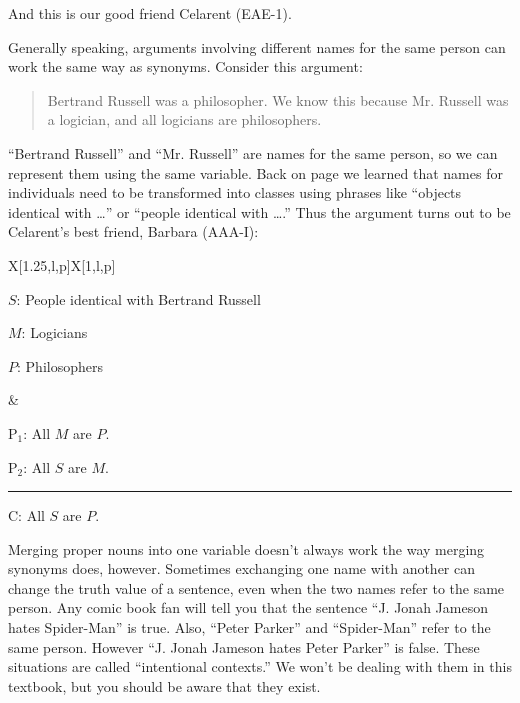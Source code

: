 And this is our good friend Celarent (EAE-1). 

Generally speaking, arguments involving different names for the same person can work the same way as synonyms. Consider this argument:

\begin{quotation}
\noindent Bertrand Russell was a philosopher. We know this because Mr. Russell was a logician, and all logicians are philosophers. 
\end{quotation}

``Bertrand Russell'' and ``Mr. Russell'' are names for the same person, so we can represent them using the same variable. Back on page \pageref{subsec:singular_propositions} we learned that names for individuals need to be transformed into classes using phrases like ``objects identical with \ldots'' or ``people identical with \ldots.''  Thus the argument turns out to be Celarent's best friend, Barbara (AAA-I):

\begin{tabu}{{X[1.25,l,p]X[1,l,p]}}


\begin{ekey}
\item[$S$:] People identical with Bertrand Russell
\item[$M$:] Logicians
\item[$P$:] Philosophers 
\end{ekey}

&

\begin{earg}
\item[P$_1$:]  All $M$ are $P$.
\item[P$_2$:] All $S$ are $M$.
\vspace{-.5em}
\item [] \rule{0.4\linewidth}{.5pt} 
\item[C:] All $S$ are $P$.
\end{earg} 

\end{tabu}

Merging proper nouns into one variable doesn't always work the way merging synonyms does, however. Sometimes exchanging one name with another can change the truth value of a sentence, even when the two names refer to the same person. Any comic book fan will tell you that the sentence ``J. Jonah Jameson hates Spider-Man'' is true. Also, ``Peter Parker'' and ``Spider-Man'' refer to the same person. However ``J. Jonah Jameson hates Peter Parker'' is false. These situations are called ``intentional contexts.'' We won't be dealing with them in this textbook, but you should be aware that they exist. 

